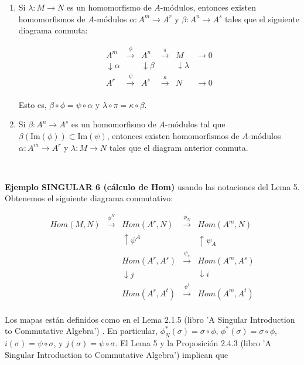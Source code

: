 \documentclass[10pt,a4paper]{article}
\begin{document}
\begin{enumerate}[label=(\alph*)]
\begin{enumerate}
    \item Si \( \lambda: M \to N \) es un homomorfismo de \( A \)-módulos, entonces existen homomorfismos de \( A \)-módulos \( \alpha: A^m \to A^r \) y \( \beta: A^n \to A^s \) tales que el siguiente diagrama conmuta:

   \[
\begin{array}{cccccc}
A^m & \xrightarrow{\phi} & A^n & \xrightarrow{\pi} & M & \rightarrow 0 \\
\downarrow\scriptstyle{\alpha} & & \downarrow\scriptstyle{\beta} & & \downarrow\scriptstyle{\lambda} & \\
A^r & \xrightarrow{\psi} & A^s & \xrightarrow{\kappa} & N & \rightarrow 0 \\
\end{array}
\]

    Esto es, \( \beta \circ \phi = \psi \circ \alpha \) y \( \lambda \circ \pi = \kappa \circ \beta \).

    \item Si \( \beta: A^n \to A^s \) es un homomorfismo de \( A \)-módulos tal que \( \beta(\text{Im}(\phi)) \subset \text{Im}(\psi) \), entonces existen homomorfismos de \( A \)-módulos \( \alpha: A^m \to A^r \) y \( \lambda: M \to N \) tales que el diagram anterior conmuta.
\end{enumerate}

\

\textbf{Ejemplo SINGULAR 6 (cálculo de Hom)} usando las notaciones del Lema 5.
\\
Obtenemos el siguiente diagrama conmutativo:

\[
\begin{array}{cccccc}
Hom(M,N) & \xrightarrow{\phi^{N}} & Hom(A^{r}, N) & \xrightarrow{\phi_{N}} & Hom(A^{m}, N) \\
& & \uparrow\scriptstyle{\psi^{A}} & & \uparrow\scriptstyle{\psi_{A}} \\
& & Hom(A^{r}, A^{s}) & \xrightarrow{\psi_{s}} & Hom(A^{m}, A^{s}) \\
& & \downarrow\scriptstyle{j} & & \downarrow\scriptstyle{i} \\
& & Hom(A^{r}, A^{t}) & \xrightarrow{\psi^{t}} & Hom(A^{m}, A^{t}) \\
\end{array}
\]

Los mapas están definidos como en el Lema 2.1.5 (libro 'A Singular Introduction to Commutative Algebra') . En particular, \(\phi^*_N(\sigma) = \sigma \circ \phi\), \(\phi^*(\sigma) = \sigma \circ \phi\), \(i(\sigma) = \psi \circ \sigma\), y \(j(\sigma) = \psi \circ \sigma\). El Lema 5 y la Proposición 2.4.3 (libro 'A Singular Introduction to Commutative Algebra') implican que


\end{enumerate}
\end{document}
